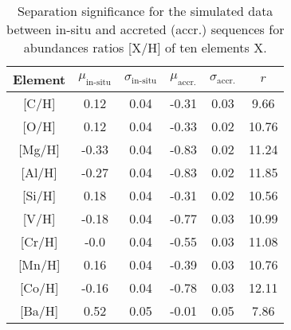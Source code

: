 \begin{table}
    \centering
    \caption{Separation significance for the simulated data between in-situ and accreted (accr.) sequences for abundances ratios [X/H] of ten elements X.}
    \begin{tabular}{cccccc}
    \hline
    Element & $\mu_\text{in-situ}$ & $\sigma_\text{in-situ}$ & $\mu_\text{accr.}$ & $\sigma_\text{accr.}$ & $r$\\
    \hline \hline
    {[C/H]}  & 0.12 & 0.04 & -0.31 & 0.03 & 9.66 \\
    {[O/H]}  & 0.12 & 0.04 & -0.33 & 0.02 & 10.76 \\
    {[Mg/H]}  & -0.33 & 0.04 & -0.83 & 0.02 & 11.24 \\
    {[Al/H]}  & -0.27 & 0.04 & -0.83 & 0.02 & 11.85 \\
    {[Si/H]}  & 0.18 & 0.04 & -0.31 & 0.02 & 10.56 \\
    {[V/H]}  & -0.18 & 0.04 & -0.77 & 0.03 & 10.99 \\
    {[Cr/H]}  & -0.0 & 0.04 & -0.55 & 0.03 & 11.08 \\
    {[Mn/H]}  & 0.16 & 0.04 & -0.39 & 0.03 & 10.76 \\
    {[Co/H]}  & -0.16 & 0.04 & -0.78 & 0.03 & 12.11 \\
    {[Ba/H]}  & 0.52 & 0.05 & -0.01 & 0.05 & 7.86 \\
    \hline
    \end{tabular}
    \label{tab:r_values_simulation}
\end{table}
